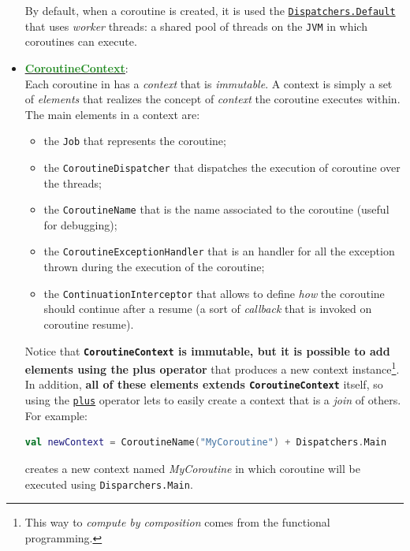 \begin{itemize}
	By default, when a coroutine is created, it is used the \href{https://kotlinlang.org/api/kotlinx.coroutines/kotlinx-coroutines-core/kotlinx.coroutines/-dispatchers/-default.html}{\texttt{Dispatchers.Default}} that uses \textit{worker} threads: a shared pool of threads on the \texttt{JVM} in which coroutines can execute. 
	
	\item \href{https://kotlinlang.org/api/latest/jvm/stdlib/kotlin.coroutines/-coroutine-context/}{\underline{\textbf{\textcolor{ForestGreen}{CoroutineContext}}}}:\\
	Each coroutine in \Kotlin has a \textit{context} that is \textit{immutable}. A context is simply a set of \textit{elements} that realizes the concept of \textit{context} the coroutine executes within.
	The main elements in a context are:
	\begin{itemize}
		\item the \texttt{Job} that represents the coroutine;
		\item the \texttt{CoroutineDispatcher} that dispatches the execution of coroutine over the threads;
		\item the \texttt{CoroutineName} that is the name associated to the coroutine (useful for debugging);
		\item the \texttt{CoroutineExceptionHandler} that is an handler for all the exception thrown during the execution of the coroutine;
		\item the \texttt{ContinuationInterceptor} that allows to define \textit{how} the coroutine should continue after a resume (a sort of \textit{callback} that is invoked on coroutine resume).
	\end{itemize}
	
	Notice that \textbf{\texttt{CoroutineContext} is immutable, but it is possible to add elements using the plus operator} that produces a new context instance\footnote{This way to \textit{compute by composition} comes from the functional programming.}. In addition, \textbf{all of these elements extends \texttt{CoroutineContext}} itself, so using the \href{https://kotlinlang.org/api/latest/jvm/stdlib/kotlin.coroutines/-coroutine-context/plus.html}{\texttt{plus}} operator lets to easily create a context that is a \textit{join} of others.
	For example:
	\begin{lstlisting}[language=Kotlin,numbers=none]
		val newContext = CoroutineName("MyCoroutine") + Dispatchers.Main
	\end{lstlisting}
	creates a new context named \textit{MyCoroutine} in which coroutine will be executed using \texttt{Disparchers.Main}.
	

\end{itemize}
